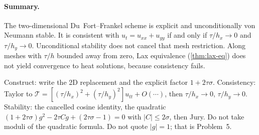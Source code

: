 \paragraph{Summary.}

The two-dimensional Du~Fort--Frankel scheme is explicit and unconditionally von Neumann stable. It is consistent with \(u_t=u_{xx}+u_{yy}\) if and only if \(\tau/h_x\to 0\) and \(\tau/h_y\to 0\). Unconditional stability does not cancel that mesh restriction. Along meshes with \(\tau/h\) bounded away from zero, Lax equivalence (\cref{thm:lax-eq}) does not yield convergence to heat solutions, because consistency fails.

\begin{examnote}
\label{examnote:p4}
Construct: write the 2D replacement and the explicit factor \(1+2\tau\sigma\). Consistency: Taylor to \(\mathcal T=[(\tau/h_x)^2+(\tau/h_y)^2]u_{tt}+O(\cdots)\), then \(\tau/h_x\to 0\), \(\tau/h_y\to 0\). Stability: the cancelled cosine identity, the quadratic \((1+2\tau\sigma)g^2-2\tau C g+(2\tau\sigma-1)=0\) with \(|C|\le 2\sigma\), then Jury. Do not take moduli of the quadratic formula. Do not quote \(|g|=1\); that is Problem~5.
\end{examnote}

